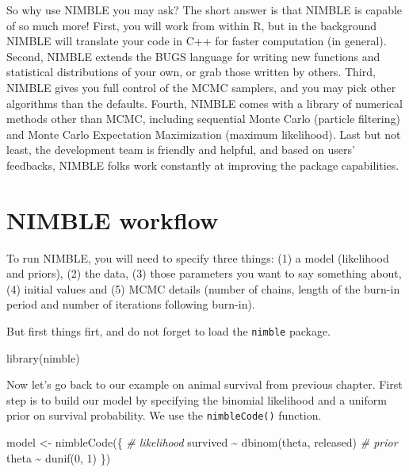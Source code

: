 \documentclass[
  12pt,
]{krantz}
\newenvironment{Shaded}{\begin{snugshade}}{\end{snugshade}}
\newcommand{\CommentTok}[1]{\textcolor[rgb]{0.56,0.35,0.01}{\textit{#1}}}
\newcommand{\DecValTok}[1]{\textcolor[rgb]{0.00,0.00,0.81}{#1}}
\newcommand{\FunctionTok}[1]{\textcolor[rgb]{0.00,0.00,0.00}{#1}}
\newcommand{\NormalTok}[1]{#1}
\newcommand{\OtherTok}[1]{\textcolor[rgb]{0.56,0.35,0.01}{#1}}
\newcommand{\SpecialCharTok}[1]{\textcolor[rgb]{0.00,0.00,0.00}{#1}}
\begin{document}
So why use NIMBLE you may ask? The short answer is that NIMBLE is capable of so much more! First, you will work from within R, but in the background NIMBLE will translate your code in C++ for faster computation (in general). Second, NIMBLE extends the BUGS language for writing new functions and statistical distributions of your own, or grab those written by others. Third, NIMBLE gives you full control of the MCMC samplers, and you may pick other algorithms than the defaults. Fourth, NIMBLE comes with a library of numerical methods other than MCMC, including sequential Monte Carlo (particle filtering) and Monte Carlo Expectation Maximization (maximum likelihood). Last but not least, the development team is friendly and helpful, and based on users' feedbacks, NIMBLE folks work constantly at improving the package capabilities.

\hypertarget{nimble-workflow}{%
\section{NIMBLE workflow}\label{nimble-workflow}}

To run NIMBLE, you will need to specify three things: (1) a model (likelihood and priors), (2) the data, (3) those parameters you want to say something about, (4) initial values and (5) MCMC details (number of chains, length of the burn-in period and number of iterations following burn-in).

But first things firt, and do not forget to load the \texttt{nimble} package.

\begin{Shaded}
\begin{Highlighting}[]
\FunctionTok{library}\NormalTok{(nimble)}
\end{Highlighting}
\end{Shaded}

Now let's go back to our example on animal survival from previous chapter. First step is to build our model by specifying the binomial likelihood and a uniform prior on survival probability. We use the \texttt{nimbleCode()} function.

\begin{Shaded}
\begin{Highlighting}[]
\NormalTok{model }\OtherTok{\textless{}{-}} \FunctionTok{nimbleCode}\NormalTok{(\{}
  \CommentTok{\# likelihood}
\NormalTok{  survived }\SpecialCharTok{\textasciitilde{}} \FunctionTok{dbinom}\NormalTok{(theta, released)}
  \CommentTok{\# prior}
\NormalTok{  theta }\SpecialCharTok{\textasciitilde{}} \FunctionTok{dunif}\NormalTok{(}\DecValTok{0}\NormalTok{, }\DecValTok{1}\NormalTok{)}
\NormalTok{\})}
\end{Highlighting}
\end{Shaded}
\end{document}
